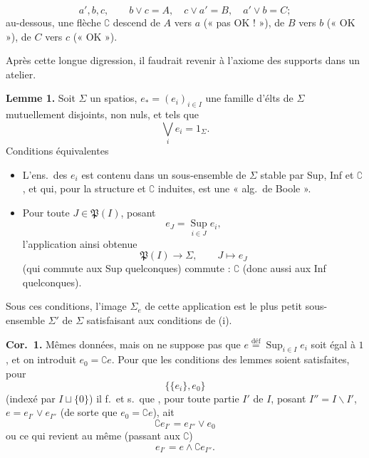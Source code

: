 \documentclass[11pt,a4paper]{article}
\begin{document}
\[
  a', b, c, \qquad b \vee c = A, \quad c \vee a' = B, \quad a' \vee b = C ;
\]
au-dessous, une flèche $\complement$ descend de $A$ vers $a$ (« pas OK ! »), de $B$ vers $b$ (« OK »), de $C$ vers $c$ (« OK »).

Après cette longue digression, il faudrait revenir à l'axiome des supports dans un atelier.

\textbf{Lemme 1.} Soit $\Sigma$ un spatios, $e_* = (e_i)_{i \in I}$ une famille d'élts de $\Sigma$ mutuellement disjoints,  non nuls, et tels que
\[
  \bigvee_i e_i = 1_\Sigma .
\]
Conditions équivalentes
\begin{itemize}
  \item[(i)] L'ens.\ des $e_i$ est contenu dans un sous-ensemble  de $\Sigma$ stable par Sup, Inf et $\complement$,  et qui, pour la structure  et $\complement$ induites, est une « alg.\ de Boole ».
  \item[(ii)]  Pour toute $J \in \mathfrak{P}(I)$, posant
  \[
    e_J = \operatorname*{Sup}_{i \in J} e_i ,
  \]
  l'application ainsi obtenue
  \[
    \mathfrak{P}(I) \longrightarrow \Sigma, \qquad J \longmapsto e_J
  \]
  (qui commute  aux Sup quelconques) commute : $\complement$ (donc aussi aux Inf quelconques).
\end{itemize}

Sous ces conditions, \struck{\ill{}} l'image $\Sigma_e$ de cette application est le plus petit sous-ensemble $\Sigma'$ de $\Sigma$ satisfaisant aux conditions de (i).

\textbf{Cor.\ 1.} Mêmes données, mais on ne suppose pas que $e \overset{\text{déf}}{=} \operatorname*{Sup}_{i \in I} e_i$ soit égal à $1$, et on introduit $e_0 = \complement e$. Pour que les conditions des lemmes soient satisfaites,  pour
\[
  \bigl\{ \{e_i\}, e_0 \bigr\}
\]
(indexé par $I \sqcup \{0\}$) il f.\ et s.\ que , pour toute partie $I'$ de $I$, posant $I'' = I \smallsetminus I'$, $e = e_{I'} \vee e_{I''}$ (de sorte que $e_0 = \complement e$),   ait
\[
  \complement e_{I'} = e_{I''} \vee e_0
\]
ou ce qui revient au même (passant aux $\complement$)
\[
  e_{I'} = e \wedge \complement e_{I''} .
\]
\end{document}
